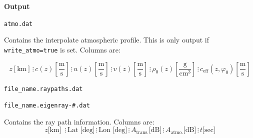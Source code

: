 \documentclass[10pt]{article}
\begin{document}
\vspace{0.01\textheight}

 \hspace{-0.25in}\textbf{Output}

	\verb=atmo.dat= 
	
	Contains the interpolate atmospheric profile.  This is only output if \verb#write_atmo=true# is set.  Columns are:
	\begin{small}
	\begin{equation*}
	 z \left[ \text{km} \right] \hspace{2pt} \vdots \hspace{2pt}
	 c (z) \left[\frac{\text{m}}{\text{s}} \right] \hspace{2pt} \vdots \hspace{2pt}
	 u(z) \left[ \frac{\text{m}}{\text{s}} \right] \hspace{2pt} \vdots \hspace{2pt}
	 v(z) \left[ \frac{\text{m}}{\text{s}} \right] \hspace{2pt} \vdots \hspace{2pt}
	 \rho_0(z) \left[ \frac{\text{g}}{\text{cm}^3} \right] \hspace{2pt} \vdots \hspace{2pt}
	 c_\text{eff} \left(z, \varphi_0 \right) \left[\frac{\text{m}}{\text{s}} \right] 
	\end{equation*}
	\end{small}
	
	\vspace*{-0.01\textheight}

	\verb=file_name.raypaths.dat= 

	 \verb=file_name.eigenray-#.dat= 
	
	Contains the ray path information.  Columns are:
	\begin{equation*}
	z \text{[km] } \hspace{2pt} \vdots \hspace{2pt} 
	\text{Lat [deg]} \hspace{2pt} \vdots \hspace{2pt}
	\text{Lon [deg]} \hspace{2pt} \vdots \hspace{2pt}
	A_\text{trans.} \text{[dB]} \hspace{2pt} \vdots \hspace{2pt}
	A_\text{atmo.} \text{[dB]} \hspace{2pt} \vdots \hspace{2pt}	
	t \text{[sec]}
	\end{equation*}
\end{document}
